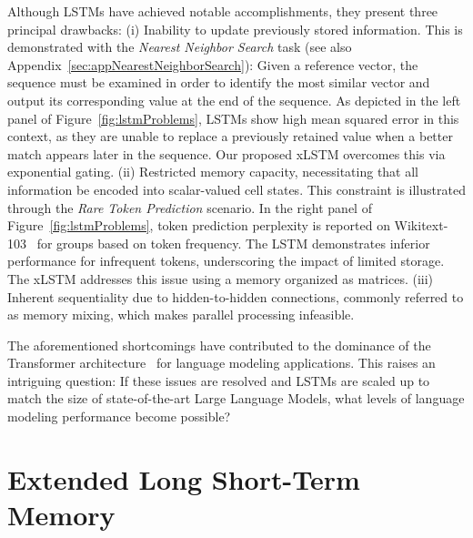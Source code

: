Although LSTMs have achieved notable accomplishments, they present three principal drawbacks: (i) Inability to update previously stored information. This is demonstrated with the {\it Nearest Neighbor Search} task (see also Appendix~\ref{sec:appNearestNeighborSearch}): Given a reference vector, the sequence must be examined in order to identify the most similar vector and output its corresponding value at the end of the sequence. As depicted in the left panel of Figure~\ref{fig:lstmProblems}, LSTMs show high mean squared error in this context, as they are unable to replace a previously retained value when a better match appears later in the sequence. Our proposed xLSTM overcomes this via exponential gating. (ii) Restricted memory capacity, necessitating that all information be encoded into scalar-valued cell states. This constraint is illustrated through the {\it Rare Token Prediction} scenario. In the right panel of Figure~\ref{fig:lstmProblems}, token prediction perplexity is reported on Wikitext-103~\citep{Merity:17} for groups based on token frequency. The LSTM demonstrates inferior performance for infrequent tokens, underscoring the impact of limited storage. The xLSTM addresses this issue using a memory organized as matrices. (iii) Inherent sequentiality due to hidden-to-hidden connections, commonly referred to as memory mixing, which makes parallel processing infeasible.

The aforementioned shortcomings have contributed to the dominance of the Transformer architecture~\citep{Vaswani:17} for language modeling applications. This raises an intriguing question: If these issues are resolved and LSTMs are scaled up to match the size of state-of-the-art Large Language Models, what levels of language modeling performance become possible?

\section{Extended Long Short-Term Memory}
\label{sec:xLSTM}

